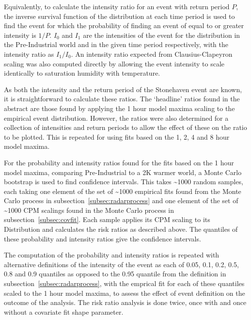 Equivalently, to calculate the intensity ratio for an event with return period $P$,
    the inverse survival function of the distribution at each time period is used to find the event for which the probability of finding an event of equal to or greater intensity is $1/P$.
$I_0$ and $I_1$ are the intensities of the event for the distribution in the Pre-Industrial world and in the given time period respectively,
    with the intensity ratio as $I_1/I_0$.
An intensity ratio expected from Clausius-Clapeyron scaling was also computed directly by allowing the event intensity to scale identically to saturation humidity with temperature.

As both the intensity and the return period of the Stonehaven event are known,
    it is straightforward to calculate these ratios.
The `headline' ratios found in the abstract are those found by applying the 1 hour model maxima scaling to the empirical event distribution.
However, the ratios were also determined for a collection of intensities and return periods to allow the effect of these on the ratio to be plotted.
This is repeated for using fits based on the 1, 2, 4 and 8 hour model maxima.

For the probability and intensity ratios found for the fits based on the 1 hour model maxima,
    comparing Pre-Industrial to a 2K warmer world,
    a Monte Carlo bootstrap is used to find confidence intervals.
This takes \textasciitilde1000 random samples, each taking one element of the set of \textasciitilde1000 empirical fits found from the Monte Carlo process in subsection~\ref{subsec:radarprocess}
    and one element of the set of \textasciitilde1000 CPM scalings found in the Monte Carlo process in subsection~\ref{subsec:covfit}.
Each sample applies its CPM scaling to its Distribution and calculates the risk ratios as described above.
The quantiles of these probability and intensity ratios give the confidence intervals.

The computation of the probability and intensity ratios is repeated with alternative definitions of the intensity of the event
    as each of 0.05, 0.1, 0.2, 0.5, 0.8 and 0.9 quantiles as opposed to the 0.95 quantile from the definition in subsection~\ref{subsec:radarprocess},
    with the emprical fit for each of these quantiles scaled to the 1 hour model maxima,
    to assess the effect of event definition on the outcome of the analysis.
The risk ratio analysis is done twice, once with and once without a covariate fit shape parameter.